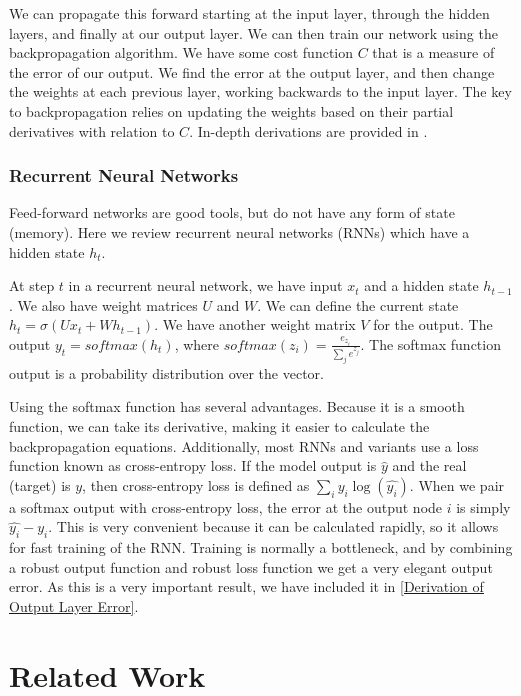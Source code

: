 \documentclass[pageno]{jpaper}
\begin{document}
We can propagate this forward starting at the input layer, through the hidden
layers, and finally at our output layer. We can then train our network using the
backpropagation algorithm. We have some cost function $C$ that is a measure of
the error of our output. We find the error at the output layer, and then change
the weights at each previous layer, working backwards to the input layer. The
key to backpropagation relies on updating the weights based on their partial
derivatives with relation to $C$. In-depth derivations are provided in
\cite{Bishop2006}.\\

\subsubsection{Recurrent Neural Networks}
\label{Recurrent Neural Networks}

Feed-forward networks are good tools, but do not have any form of state
(memory). Here we review recurrent neural networks (RNNs) which have a hidden
state $h_t$.

At step $t$ in a recurrent neural network, we have input $x_t$ and a hidden
state $h_{t-1}$. We also have weight matrices $U$ and $W$. We can define the
current state $h_t = \sigma(Ux_t + Wh_{t-1})$. We have another weight matrix $V$
for the output. The output $y_t = softmax(h_t)$, where $softmax(z_i) =
\frac{e_{z_i}}{\sum_j e^{z_j}}$. The softmax function output is a probability
distribution over the vector.

Using the softmax function has several advantages. Because it is a smooth
function, we can take its derivative, making it easier to calculate the
backpropagation equations. Additionally, most RNNs and variants use a loss
function known as cross-entropy loss. If the model output is $\hat{y}$ and the
real (target) is $y$, then cross-entropy loss is defined as $\sum_i y_i
\log(\hat{y_{i}})$. When we pair a softmax output with cross-entropy loss, the
error at the output node $i$ is simply $\hat{y_i} - y_i$. This is very
convenient because it can be calculated rapidly, so it allows for fast training
of the RNN. Training is normally a bottleneck, and by combining a robust output
function and robust loss function we get a very elegant output error. As this is
a very important result, we have included it in \ref{Derivation of Output Layer
Error}.

\section{Related Work}
\label{Related Work}
\end{document}
